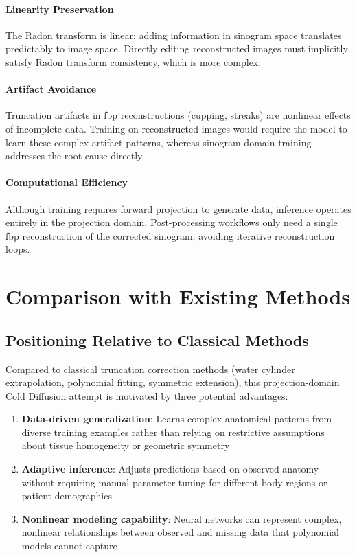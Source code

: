 \paragraph{Linearity Preservation}
The Radon transform is linear; adding information in sinogram space translates predictably to image space. Directly editing reconstructed images must implicitly satisfy Radon transform consistency, which is more complex.

\paragraph{Artifact Avoidance}
Truncation artifacts in \gls{fbp} reconstructions (cupping, streaks) are nonlinear effects of incomplete data. Training on reconstructed images would require the model to learn these complex artifact patterns, whereas sinogram-domain training addresses the root cause directly.

\paragraph{Computational Efficiency}
Although training requires forward projection to generate data, inference operates entirely in the projection domain. Post-processing workflows only need a single \gls{fbp} reconstruction of the corrected sinogram, avoiding iterative reconstruction loops.

\section{Comparison with Existing Methods}

\subsection{Positioning Relative to Classical Methods}

Compared to classical truncation correction methods (water cylinder extrapolation, polynomial fitting, symmetric extension), this projection-domain Cold Diffusion attempt is motivated by three potential advantages:

\begin{enumerate}
    \item \textbf{Data-driven generalization}: Learns complex anatomical patterns from diverse training examples rather than relying on restrictive assumptions about tissue homogeneity or geometric symmetry
    \item \textbf{Adaptive inference}: Adjusts predictions based on observed anatomy without requiring manual parameter tuning for different body regions or patient demographics
    \item \textbf{Nonlinear modeling capability}: Neural networks can represent complex, nonlinear relationships between observed and missing data that polynomial models cannot capture
\end{enumerate}


